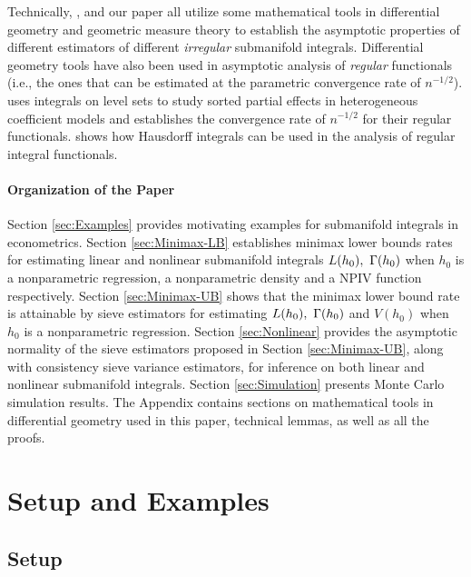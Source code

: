 \documentclass[12pt,american]{article}
\theoremstyle{definition}
\theoremstyle{plain}
\theoremstyle{definition}
\theoremstyle{plain}
\theoremstyle{plain}
\theoremstyle{plain}
\theoremstyle{plain}
\theoremstyle{plain}
\begin{document}
Technically, \citet*{qiao2021nonparametric}, \citet*{cattaneo2025dist,cattaneo2025loc} and our paper all utilize some mathematical tools in differential geometry and geometric measure theory to establish the asymptotic properties of different estimators of different \textit{irregular} submanifold integrals. Differential geometry tools have also been used in asymptotic analysis of \textit{regular} functionals (i.e., the ones that can be estimated at the parametric convergence rate of $n^{-1/2}$). \citet*{chernozhukov2018sorted} uses integrals on level sets to study sorted partial effects in heterogeneous coefficient models and establishes the convergence rate of $n^{-1/2}$ for their regular functionals. \citet*{feng2024statistical} shows how Hausdorff integrals can be used in the analysis of regular integral functionals.

\paragraph{Organization of the Paper}
Section \ref{sec:Examples} provides motivating examples for submanifold integrals in econometrics. Section \ref{sec:Minimax-LB} establishes minimax lower bounds rates for estimating linear and nonlinear submanifold integrals $L(h_0),~\Gamma(h_0)$ when $h_0$ is a nonparametric regression, a nonparametric density and a NPIV function respectively. Section  \ref{sec:Minimax-UB} shows that the minimax lower bound rate is attainable by sieve estimators for estimating $L(h_0),~\Gamma(h_0)$ and $V(h_0)$ when $h_0$ is a nonparametric regression. Section \ref{sec:Nonlinear} provides the asymptotic normality of the sieve estimators proposed in Section \ref{sec:Minimax-UB}, along with consistency sieve variance estimators, for inference on both linear and nonlinear submanifold integrals.
Section \ref{sec:Simulation} presents Monte Carlo simulation results.
The Appendix contains sections on mathematical tools in differential geometry used in this paper, technical lemmas, as well as all the proofs.


\section{\label{sec:Examples} Setup and Examples}

\subsection{Setup}\label{subsec:Setup}
\end{document}
